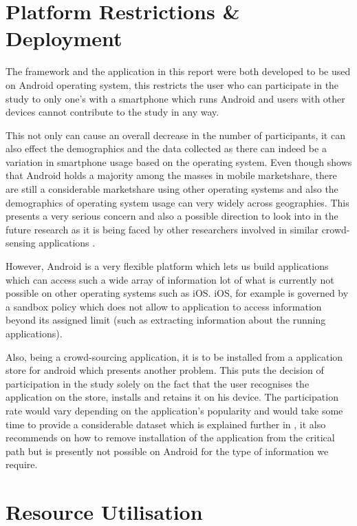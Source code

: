 \documentclass[12pt]{report}
\begin{document}
\section{Platform Restrictions \& Deployment}
\label{PlatformDeployment}
The framework and the application in this report were both developed to be used on Android operating system, this restricts the user who can participate in the study to only one's with a smartphone which runs Android and users with other devices cannot contribute to the study in any way. 

This not only can cause an overall decrease in the number of participants, it can also effect the demographics and the data collected as there can indeed be a variation in smartphone usage based on the operating system. Even though \cite{gartnerMobileSurvey2013} shows that Android holds a majority among the masses in mobile marketshare, there are still a considerable marketshare using other operating systems and also the demographics of operating system usage can very widely across geographies. This presents a very serious concern and also a possible direction to look into in the future research as it is being faced by other researchers involved in similar crowd-sensing applications \cite{balan2011real}. 

However, Android is a very flexible platform which lets us build applications which can access such a wide array of information lot of what is currently not possible on other operating systems such as iOS. iOS, for example is governed by a sandbox policy \cite{AppleiOSPolicy} which does not allow to application to access information beyond its assigned limit (such as extracting information about the running applications).

Also, being a crowd-sourcing application, it is to be installed from a application store for android which presents another problem. This puts the decision of participation in the study solely on the fact that the user recognises the application on the store, installs and retains it on his device. The participation rate would vary depending on the application's popularity and would take some time to provide a considerable dataset which is explained further in \cite{xiao2013lowering}, it also recommends on how to remove installation of the application from the critical path but is presently not possible on Android for the type of information we require.

\section{Resource Utilisation}
\end{document}
